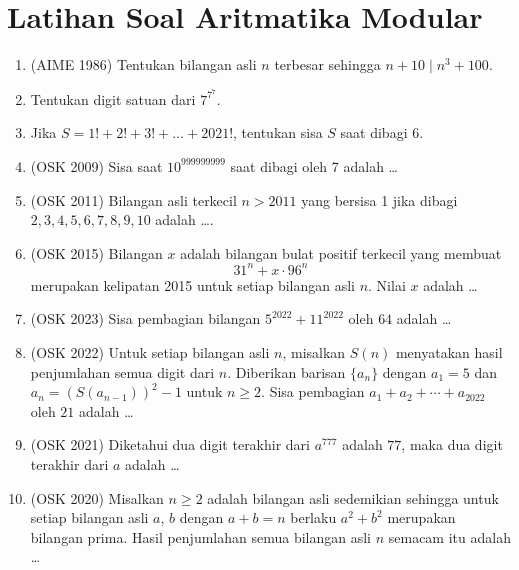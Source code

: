 \documentclass[12pt, letter]{scrartcl}
\begin{document}


\section{Latihan Soal Aritmatika Modular}
\begin{enumerate}    
    \item (AIME 1986) Tentukan bilangan asli $n$ terbesar sehingga $n+10 \mid n^3+100$.
    
    \item Tentukan digit satuan dari $7^{7^7}$.
    
    \item Jika $S=1!+2!+3!+\dots+2021!$, tentukan sisa $S$ saat dibagi 6.
    
    \item (OSK 2009) Sisa saat $10^{999999999}$ saat dibagi oleh 7 adalah \dots
    
    \item (OSK 2011) Bilangan asli terkecil $n>2011$ yang bersisa 1 jika dibagi $2,3,4,5,6,7,8,9,10$ adalah \dots.

    \item (OSK 2015) Bilangan $x$ adalah bilangan bulat positif terkecil yang membuat
    \[31^n + x \cdot 96^n\]
    merupakan kelipatan 2015 untuk setiap bilangan asli $n$. Nilai $x$ adalah \ldots

    \item (OSK 2023) Sisa pembagian bilangan $5^{2022}+11^{2022}$ oleh $64$ adalah \ldots

    \item (OSK 2022) Untuk setiap bilangan asli $n$, misalkan $S(n)$ menyatakan hasil penjumlahan semua digit dari $n$. Diberikan barisan $\{a_n\}$ dengan $a_1 = 5$ dan $a_n = (S(a_{n-1}))^2 - 1$ untuk $n \geq 2$. Sisa pembagian $a_1 + a_2 + \cdots + a_{2022}$ oleh $21$ adalah \ldots
    
    \item (OSK 2021) Diketahui dua digit terakhir dari $a^{777}$ adalah $77$, maka dua digit terakhir dari $a$ adalah \ldots

    \item (OSK 2020) Misalkan $n \geq 2$ adalah bilangan asli sedemikian sehingga untuk setiap bilangan asli $a$, $b$ dengan $a + b = n$ berlaku $a^2 + b^2$ merupakan bilangan prima. Hasil penjumlahan semua bilangan asli $n$ semacam itu adalah \ldots


\end{enumerate}
\end{document}
